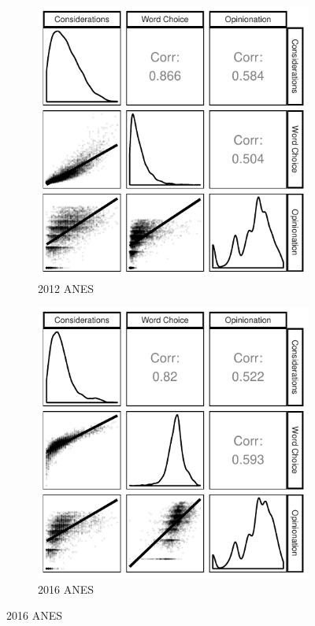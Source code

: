 \begin{figure}[h]
    \centering
    \begin{subfigure}[h]{0.5\textwidth}
        \centering
        \includegraphics{../fig/anes2012_corplot_components.pdf}
        \caption{2012 ANES}
    \end{subfigure}%
    \begin{subfigure}[h]{0.5\textwidth}
         \centering
         \includegraphics{../fig/anes2016_corplot_components.pdf}
         \caption{2016 ANES}
    \end{subfigure}%
    

\end{figure}
